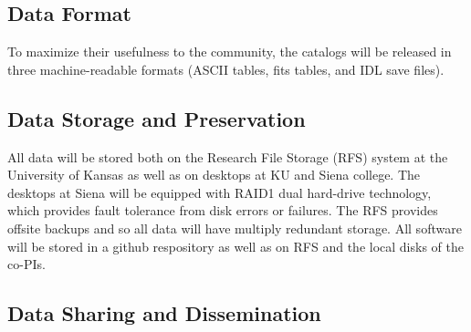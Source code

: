 \documentclass[11pt,preprint]{aastex}
\begin{document}



\subsection*{Data Format} 

To maximize their usefulness to the community, the catalogs will be
released in three machine-readable formats (ASCII tables, fits tables,
and IDL save files). 

\subsection*{Data Storage and Preservation}

All data will be stored both on the Research File Storage (RFS) system at the University of Kansas as well as on desktops at KU and Siena college.  The desktops at Siena will be equipped with RAID1 dual hard-drive technology, which provides fault tolerance from disk errors or failures.   The RFS provides offsite backups and so all data will have multiply redundant storage.  All software will be stored in a github respository as well as on RFS and the local disks of the co-PIs.


\subsection*{Data Sharing and Dissemination}
\end{document}
